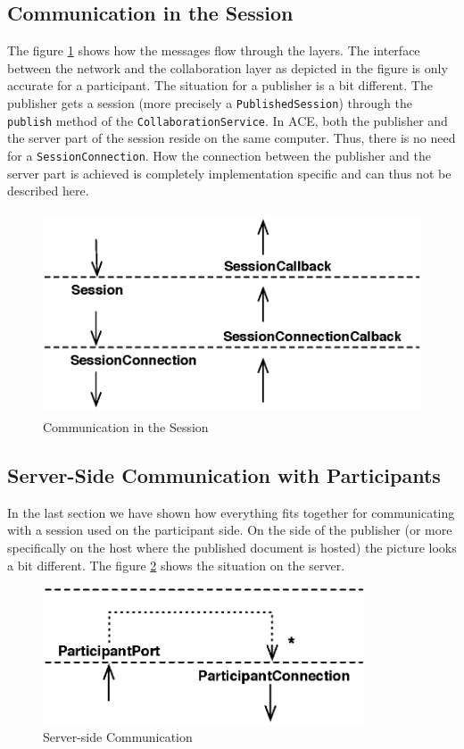\subsection{Communication in the Session}
The figure \ref{fig:archoverview.flow.session} shows how the messages flow
through the layers. The interface between the network and the collaboration
layer as depicted in the figure is only accurate for a participant. The
situation for a publisher is a bit different. The publisher gets a
session (more precisely a \texttt{Published\-Session}) through the
\texttt{publish} method of the \texttt{Collaboration\-Service}. In ACE, both
the publisher and the server part of the session reside on the same
computer. Thus, there is no need for a \texttt{Session\-Connection}. How the
connection between the publisher and the server part is achieved is completely
implementation specific and can thus not be described here.

\begin{figure}[H]
 \centering
 \includegraphics[width=11.78cm,height=6.00cm]{../images/finalreport/architecture_flows/session.eps}
 \caption{Communication in the Session}
 \label{fig:archoverview.flow.session}
\end{figure}


\subsection{Server-Side Communication with Participants}
In the last section we have shown how everything fits together for 
communicating with a session used on the participant side. 
On the side of the publisher (or more specifically
on the host where the published document is hosted) the picture looks 
a bit different. The figure \ref{fig:archoverview.flow.portconnection}
shows the situation on the server.

\begin{figure}[H]
 \centering
 \includegraphics[width=9.56cm,height=4.09cm]{../images/finalreport/architecture_flows/portconnection.eps}
 \caption{Server-side Communication}
 \label{fig:archoverview.flow.portconnection}
\end{figure}

